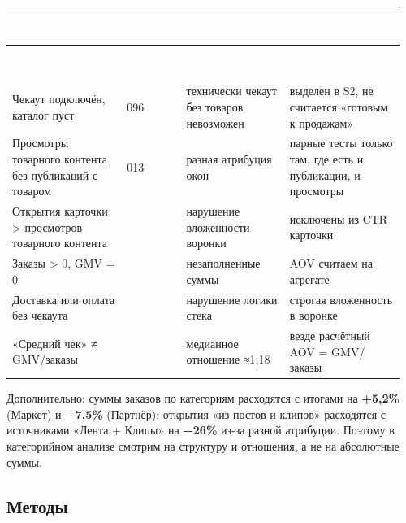 \documentclass[10pt,a4paper]{article}
\begin{document}
\begingroup
\small
\setlength{\tabcolsep}{3pt}
\renewcommand{\arraystretch}{1.12}
\begin{longtable}{@{}>{\raggedright\arraybackslash}p{0.3187\linewidth}>{\raggedright\arraybackslash}p{0.0485\linewidth}>{\raggedright\arraybackslash}p{0.2771\linewidth}>{\raggedright\arraybackslash}p{0.3187\linewidth}@{}}
\rowcolor{blue}
\textcolor{white}{\textbf{Аномалия}} & \textcolor{white}{\textbf{Масштаб}} & \textcolor{white}{\textbf{Почему проблема}} & \textcolor{white}{\textbf{Решение}} \\
\endfirsthead
\rowcolor{blue}
\textcolor{white}{\textbf{Аномалия}} & \textcolor{white}{\textbf{Масштаб}} & \textcolor{white}{\textbf{Почему проблема}} & \textcolor{white}{\textbf{Решение}} \\
\endhead
\hline
Чекаут подключён, каталог пуст & 2 096 & технически чекаут без товаров невозможен & выделен в S2, не считается «готовым к продажам» \\
Просмотры товарного контента без публикаций с товаром & 1 013 & разная атрибуция окон & парные тесты только там, где есть и публикации, и просмотры \\
Открытия карточки > просмотров товарного контента & 40 & нарушение вложенности воронки & исключены из CTR карточки \\
Заказы > 0, GMV = 0 & 7 & незаполненные суммы & AOV считаем на агрегате \\
Доставка или оплата без чекаута & 168 & нарушение логики стека & строгая вложенность в воронке \\
«Средний чек» ≠ GMV/заказы & 291 & медианное отношение ≈1,18 & везде расчётный AOV = GMV/заказы \\
\hline
\end{longtable}
\endgroup
\vspace{4pt}

Дополнительно: суммы заказов по категориям расходятся с итогами на \textbf{+5,2\%} (Маркет) и \textbf{−7,5\%} (Партнёр); открытия «из постов и клипов» расходятся с источниками «Лента + Клипы» на \textbf{−26\%} из-за разной атрибуции. Поэтому в категорийном анализе смотрим на структуру и отношения, а не на абсолютные суммы.\par

\subsection{Методы}
\end{document}
